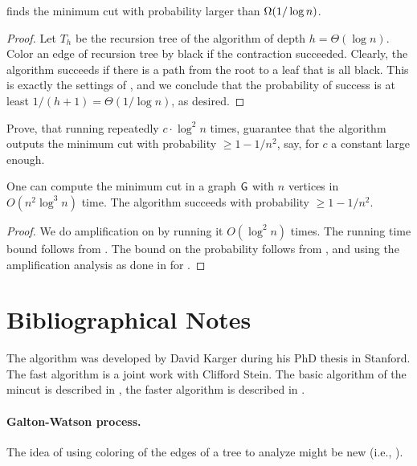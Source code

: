 \begin{lemma}
    \FastCut{} finds the minimum cut with probability larger than
    $\Omega\pth[]{1/\log n}$.    
\end{lemma}
\begin{proof}
    Let $T_h$ be the recursion tree of the algorithm of depth $h =
    \Theta( \log n)$.  Color an edge of recursion tree by black if the
    contraction succeeded. Clearly, the algorithm succeeds if there is
    a path from the root to a leaf that is all black. This is exactly
    the settings of , and we conclude that the
    probability of success is at least $1/(h+1) = \Theta(1/\log n)$,
    as desired.
\end{proof}

\begin{exercise}
    Prove, that running \FastCut{} repeatedly $c\cdot\log^{2}n$ times,
    guarantee that the algorithm outputs the minimum cut with
    probability $\geq1-1/n^{2}$, say, for $c$ a constant large enough.
\end{exercise} %

\begin{theorem}
    One can compute the minimum cut in a graph $\mathsf{G}$ with $n$
    vertices in $O(n^2 \log^3 n)$ time. The algorithm succeeds with
    probability $\geq 1-1/n^2$.
\end{theorem}
\begin{proof}
    We do amplification on \FastCut by running it $O(\log^2 n)$
    times. The running time bound follows from
    . The bound on the probability
    follows from , and using the
    amplification analysis as done in 
    for \MinCutRep{}.
\end{proof}






\section{Bibliographical Notes}

The \MinCut{} algorithm was developed by David Karger during his PhD
thesis in Stanford. The fast algorithm is a joint work with Clifford
Stein.  The basic algorithm of the mincut is described in \cite[pages
7--9]{mr-ra-95}, the faster algorithm is described in \cite[pages
289--295]{mr-ra-95}.

\paragraph*{Galton-Watson process.}
The idea of using coloring of the edges of a tree to analyze \FastCut
might be new (i.e., ).


%  


% 
% 
\ChapterEnd{}

